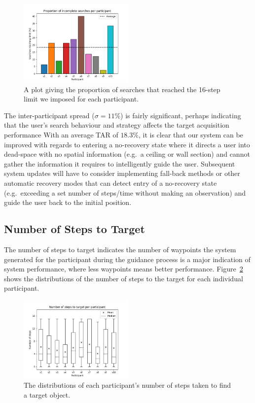 \documentclass[a4paper, twoside]{article}
\begin{document}
\begin{figure}
  \centering
  \includegraphics[width=0.5\textwidth]{figures/incomplete_searches_subjects.png}
  \caption{A plot giving the proportion of searches that reached the 16-step limit we imposed for each participant. }\label{fig:incomplete-searches-subjects}
\end{figure}

The inter-participant spread ($\sigma=11\%$) is fairly significant, perhaps indicating that the user's search behaviour and strategy affects the target acquisition performance  With an average TAR of $18.3\%$, it is clear that our system can be improved with regards to entering a no-recovery state where it directs a user into dead-space with no spatial information (e.g.\ a ceiling or wall section) and cannot gather the information it requires to intelligently guide the user. Subsequent system updates will have to consider implementing fall-back methods or other automatic recovery modes that can detect entry of a no-recovery state (e.g.\ exceeding a set number of steps/time without making an observation) and guide the user back to the initial position.

\subsection{Number of Steps to Target}

\noindent The number of steps to target indicates the number of waypoints the system generated for the participant during the guidance process is a major indication of system performance, where less waypoints means better performance. Figure~\ref{fig:nsteps-participants} shows the distributions of the number of steps to the target for each individual participant. 

\begin{figure}
  \centering
  \includegraphics[width=0.5\textwidth]{figures/boxplot_nsteps_subjects.png}
  \caption{The distributions of each participant's number of steps taken to find a target object. }\label{fig:nsteps-participants}
\end{figure}
\end{document}
